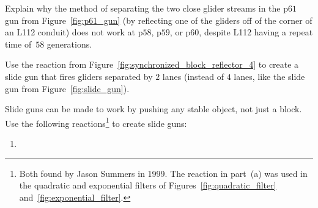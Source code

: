 \begin{multicols}{2}
	
	\mfilbreak
	
	
	\begin{problem}\label{exer:p61_gun_reflection_no_60} 
		Explain why the method of separating the two close glider streams in the p$61$ gun from Figure~\ref{fig:p61_gun} (by reflecting one of the gliders off of the corner of an L112 conduit) does not work at p$58$, p$59$, or p$60$, despite L112 having a repeat time of~$58$ generations.
	\end{problem}
	
	
	\mfilbreak
	
	
	\begin{problem}\label{exer:2_lane_slide_gun} 
		Use the reaction from Figure~\ref{fig:synchronized_block_reflector_4} to create a slide gun that fires gliders separated by $2$ lanes (instead of $4$ lanes, like the slide gun from Figure~\ref{fig:slide_gun}).
	\end{problem}
	
	
	\mfilbreak
	
	
	\begin{problem}\label{exer:slide_gun_honey_farm} 
		Slide guns can be made to work by pushing any stable object, not just a block. Use the following reactions\footnote{Both found by Jason Summers in 1999. The reaction in part~(a) was used in the quadratic and exponential filters of Figures~\ref{fig:quadratic_filter} and~\ref{fig:exponential_filter}.} to create slide guns:\\[0.05cm]
		
		\begin{enumerate}[label=\bf\color{ocre}(\alph*)]
			\item {}\\[0.1cm]
			

\end{enumerate}
\end{problem}
\end{multicols}
